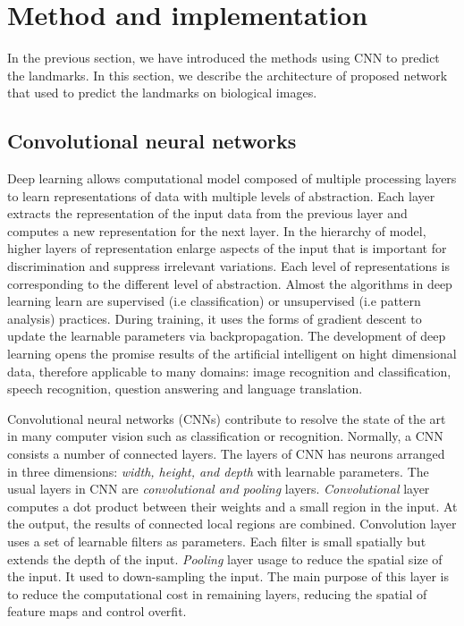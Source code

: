 \documentclass[conference]{IEEEtran}
\begin{document}
\section{Method and implementation}
\label{sec3}
In the previous section, we have introduced the methods using CNN to predict the landmarks. In this section, we describe the architecture of proposed network that used to predict the landmarks on biological images.
\subsection{Convolutional neural networks}
Deep learning allows computational model composed of multiple processing layers to learn representations of data with multiple levels of abstraction\cite{lecun2015deep}. Each layer extracts the representation of the input data from the previous layer and computes a new representation for the next layer. In the hierarchy of model, higher layers of representation enlarge aspects of the input that is important for discrimination and suppress irrelevant variations. Each level of representations is corresponding to the different level of abstraction. Almost the algorithms in deep learning learn are supervised (i.e classification) or unsupervised (i.e pattern analysis) practices. During training, it uses the forms of gradient descent to update the learnable parameters via backpropagation. The development of deep learning opens the promise results of the artificial intelligent on hight dimensional data, therefore applicable to many domains: image recognition and classification\cite{krizhevsky2012imagenet,ciregan2012multi,szegedy2015going}, speech recognition\cite{mikolov2011strategies,hinton2012deep,sainath2013deep}, question answering\cite{bordes2014question} and language translation\cite{sutskever2014sequence}\cite{jean2014using}.

Convolutional neural networks (CNNs) contribute to resolve the state of the art in many computer vision such as classification\cite{krizhevsky2012imagenet}\cite{ciregan2012multi} or recognition\cite{li2015convolutional}\cite{tompson2014joint}. Normally, a CNN consists a number of connected layers. The layers of CNN has neurons arranged in three dimensions: \textit{width, height, and depth} with learnable parameters. The usual layers in CNN are \textit{convolutional and pooling} layers. \textit{Convolutional} layer computes a dot product between their weights and a small region in the input. At the output, the results of connected local regions are combined. Convolution layer uses a set of learnable filters as parameters. Each filter is small spatially but extends the depth of the input. \textit{Pooling} layer usage to reduce the spatial size of the input. It used to down-sampling the input. The main purpose of this layer is to reduce the computational cost in remaining layers, reducing the spatial of feature maps and control overfit.
\end{document}
